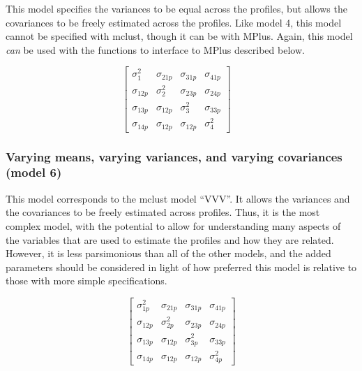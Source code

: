 \documentclass[]{msu-thesis}
\theoremstyle{definition}
\theoremstyle{definition}
\theoremstyle{definition}
\theoremstyle{remark}
\begin{document}
This model specifies the variances to be equal across the profiles, but
allows the covariances to be freely estimated across the profiles. Like
model 4, this model cannot be specified with mclust, though it can be
with MPlus. Again, this model \emph{can} be used with the functions to
interface to MPlus described below.

\[
\left[ \begin{matrix} { \sigma  }_{ 1 }^{ 2 } & { \sigma  }_{ 21p } & { \sigma  }_{ 31p } & { \sigma  }_{ 41p } \\ { \sigma  }_{ 12p } & { \sigma  }_{ 2 }^{ 2 } & { \sigma  }_{ 23p } & { \sigma  }_{ 24p } \\ { \sigma  }_{ 13p } & { \sigma  }_{ 12p } & { \sigma  }_{ 3 }^{ 2 } & { \sigma  }_{ 33p } \\ { \sigma  }_{ 14p } & { \sigma  }_{ 12p } & { \sigma  }_{ 12p } & { \sigma  }_{ 4 }^{ 2 } \end{matrix} \right] \quad 
\]

\subsubsection{Varying means, varying variances, and varying covariances
(model
6)}\label{varying-means-varying-variances-and-varying-covariances-model-6}

This model corresponds to the mclust model ``VVV''. It allows the
variances and the covariances to be freely estimated across profiles.
Thus, it is the most complex model, with the potential to allow for
understanding many aspects of the variables that are used to estimate
the profiles and how they are related. However, it is less parsimonious
than all of the other models, and the added parameters should be
considered in light of how preferred this model is relative to those
with more simple specifications.

\[
\left[ \begin{matrix} { \sigma  }_{ 1p }^{ 2 } & { \sigma  }_{ 21p } & { \sigma  }_{ 31p } & { \sigma  }_{ 41p } \\ { \sigma  }_{ 12p } & { \sigma  }_{ 2p }^{ 2 } & { \sigma  }_{ 23p } & { \sigma  }_{ 24p } \\ { \sigma  }_{ 13p } & { \sigma  }_{ 12p } & { \sigma  }_{ 3p }^{ 2 } & { \sigma  }_{ 33p } \\ { \sigma  }_{ 14p } & { \sigma  }_{ 12p } & { \sigma  }_{ 12p } & { \sigma  }_{ 4p }^{ 2 } \end{matrix} \right] 
\]
\end{document}
